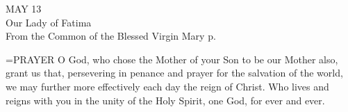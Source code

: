 \begin{center}\normalsize MAY 13\\
\footnotesize Our Lady of Fatima\\
\footnotesize From the Common of the Blessed Virgin Mary  p.\\
\end{center}

\hangindent=\parindent \small{PRAYER 
O God, who chose the Mother of your Son to be our Mother also,
grant us that, persevering in penance and prayer
for the salvation of the world,
we may further more effectively each day the reign of Christ.
Who lives and reigns with you in the unity of the Holy Spirit,
one God, for ever and ever.\\}
 
